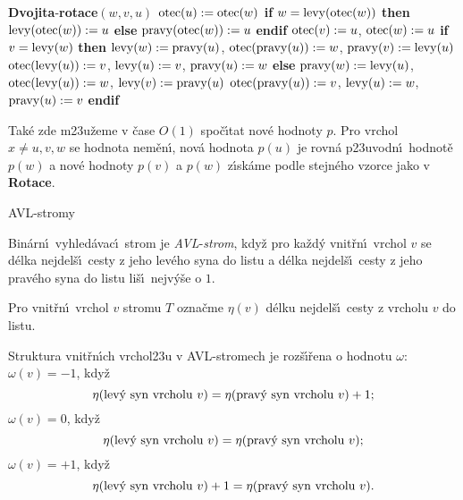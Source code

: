 {\bf Dvojita}-{\bf rotace$(w,v,u)$\newline 
$\operatorname{otec}(u):=\operatorname{otec}(w)$\newline 
if} $w=\operatorname{levy}(\operatorname{otec}(w))$ {\bf then}\newline 
\phantom{---}$\operatorname{levy}(\operatorname{otec}(w)):=u$\newline 
{\bf else}\newline 
\phantom{---}$\operatorname{pravy}(\operatorname{otec}(w)):=u$\newline 
{\bf endif}\newline 
$\operatorname{otec}(v):=u$, $\operatorname{otec}(w):=u$\newline 
{\bf if} $v=\operatorname{levy}(w)$ {\bf then}\newline  
\phantom{---}$\operatorname{levy}(w):=\operatorname{pravy}(u)$, $\operatorname{otec}(\operatorname{pravy}(u)):=w$, $\operatorname{pravy}(v):=\operatorname{levy}(u)$\newline \phantom{---}$\operatorname{otec}(\operatorname{levy}(u)):=v$, $\operatorname{levy}(u):=v$, $\operatorname{pravy}(u):=w$\newline 
{\bf else}\newline 
\phantom{---}$\operatorname{pravy}(w):=\operatorname{levy}(u)$, $\operatorname{otec}(\operatorname{levy}(u)):=w$, $\operatorname{levy}(v):=\operatorname{pravy}(u)$\newline 
\phantom{---}$\operatorname{otec}(\operatorname{pravy}(u)):=v$, $\operatorname{levy}(u):=w$, $\operatorname{pravy}(u):=v$\newline 
{\bf endif}
\medskip

\flushpar Tak\'e zde m\accent23u\v zeme v \v case $O(1)$ spo\v c\'\i tat nov\'e hodnoty $
p$. 
Pro vrchol $x\ne u,v,w$ se hodnota nem\v en\'\i , nov\'a hodnota 
$p(u)$ je 
rovn\'a p\accent23uvodn\'\i\ hodnot\v e $p(w)$ a nov\'e hodnoty $
p(v)$ 
a $p(w)$ 
z\'\i sk\'ame pod\-le stejn\'eho vzorce  jako v {\bf Rotace}.

\heading
AVL-stromy
\endheading

\flushpar Bin\'arn\'\i\ vyhled\'avac\'\i\ strom je 
\emph{AVL}-\emph{strom}, kdy\v z pro ka\v zd\'y vnit\v r\-n\'\i\ vrchol 
$v$ se d\'elka nejdel\v s\'\i\ cesty z jeho lev\'eho syna do 
listu a d\'elka nejdel\v s\'\i\ cesty z jeho prav\'eho syna do listu 
li\v s\'\i\ nejv\'y\v se o $1$.  
\medskip

\flushpar Pro vnit\v rn\'\i\ vrchol $v$ stromu $T$ ozna\v cme $\eta 
(v)$ 
d\'elku nejdel\v s\'\i\ cesty z vrcholu $v$ do listu.
\medskip
 
\flushpar Struktura vnit\v rn\'\i ch vrchol\accent23u v 
AVL-stromech je roz\v s\'\i\v rena o hodnotu $\omega$:\newline 
$\omega (v)=-1$, kdy\v z 
$$\eta (\text{\rm lev\'y syn vrcholu }v)=\eta (\text{\rm prav\'y syn vrcholu }
v)+1;$$
$\omega (v)=0$, kdy\v z 
$$\eta (\text{\rm lev\'y syn vrcholu }v)=\eta (\text{\rm prav\'y syn vrcholu }
v);$$
$\omega (v)=+1$, kdy\v z
$$\eta (\text{\rm lev\'y syn vrcholu }v)+1=\eta (\text{\rm prav\'y syn vrcholu }
v).$$
\medskip

